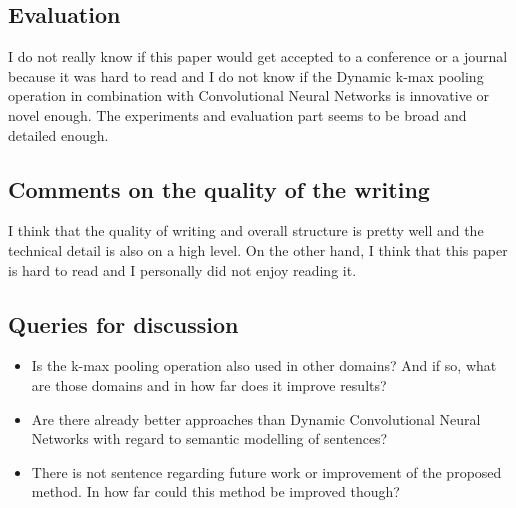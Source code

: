 \documentclass[a4paper]{article}
\begin{document}
\subsection{Evaluation}

I do not really know if this paper would get accepted to a conference or a journal because it was hard to read and I do not know if the Dynamic k-max pooling operation in combination with Convolutional Neural Networks is innovative or novel enough. The experiments and evaluation part seems to be broad and detailed enough.

\subsection{Comments on the quality of the writing}

I think that the quality of writing and overall structure is pretty well and the technical detail is also on a high level. On the other hand, I think that this paper is hard to read and I personally did not enjoy reading it.

\subsection{Queries for discussion}

\begin{itemize}
	\item Is the k-max pooling operation also used in other domains? And if so, what are those domains and in how far does it improve results?
	\item Are there already better approaches than Dynamic Convolutional Neural Networks with regard to semantic modelling of sentences?
	\item There is not sentence regarding future work or improvement of the proposed method. In how far could this method be improved though? 
\end{itemize}
\end{document}
